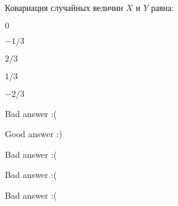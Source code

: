
\begin{question}
Ковариация случайных величин \(X\) и \(Y\) равна:
\begin{answerlist}
  \item \(0\)
  \item \(-1/3\)
  \item \(2/3\)
  \item \(1/3\)
  \item \(-2/3\)
\end{answerlist}
\end{question}

\begin{solution}
\begin{answerlist}
  \item Bad answer :(
  \item Good answer :)
  \item Bad answer :(
  \item Bad answer :(
  \item Bad answer :(
\end{answerlist}
\end{solution}

